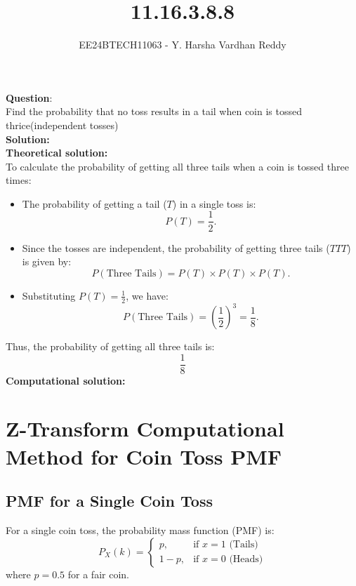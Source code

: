 \documentclass[journal]{IEEEtran}
\begin{document}
	
	
	\vspace{3cm}
	
	\title{11.16.3.8.8}
	\author{EE24BTECH11063 - Y. Harsha Vardhan Reddy }
	{\let\newpage\relax\maketitle}
	
	\renewcommand{\thefigure}{\theenumi}
	\renewcommand{\thetable}{\theenumi}
	\setlength{\intextsep}{10pt} %
	
	
	\renewcommand{\thetable}{\theenumi}
	
	
\textbf{Question}:\\
Find the probability that no toss results in a tail when coin is tossed thrice(independent tosses) \\
\textbf{Solution: }\\
\textbf{Theoretical solution: }\\
To calculate the probability of getting all three tails when a coin is tossed three times:

\begin{itemize}
    \item The probability of getting a tail (\(T\)) in a single toss is:
    \[
    P(T) = \frac{1}{2}.
    \]
    \item Since the tosses are independent, the probability of getting three tails (\(TTT\)) is given by:
    \[
    P(\text{Three Tails}) = P(T) \times P(T) \times P(T).
    \]
    \item Substituting \(P(T) = \frac{1}{2}\), we have:
    \[
    P(\text{Three Tails}) = \left(\frac{1}{2}\right)^3 = \frac{1}{8}.
    \]
\end{itemize}

Thus, the probability of getting all three tails is:
\[
\boxed{\frac{1}{8}}
\]
\textbf{Computational solution: }\\


\section*{Z-Transform Computational Method for Coin Toss PMF}
\subsection*{PMF for a Single Coin Toss}
For a single coin toss, the probability mass function (PMF) is:
\[
P_X(k) =
\begin{cases}
p, & \text{if } x = 1 \text{ (Tails)} \\
1-p, & \text{if } x = 0 \text{ (Heads)}
\end{cases}
\]
where \(p = 0.5\) for a fair coin.
\end{document}
